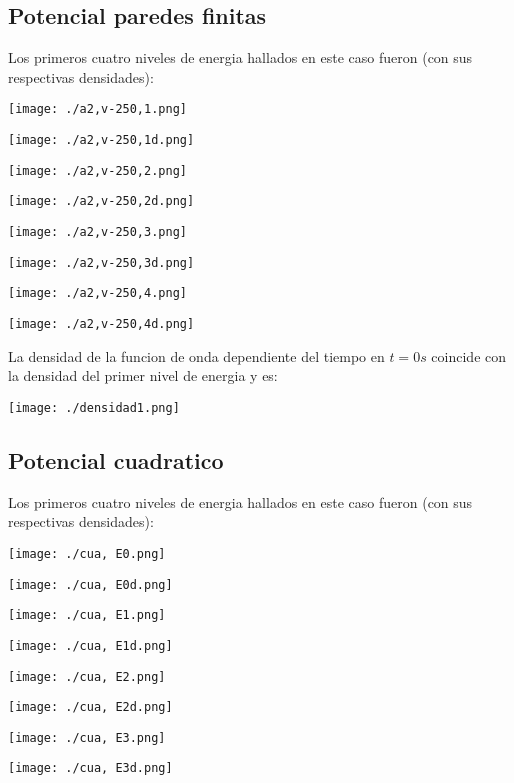 \documentclass[a4paper, twocolumn, 10pt]{article}
\begin{document}
\subsection{Potencial paredes finitas}
    Los primeros cuatro niveles de energia hallados en este caso fueron (con sus respectivas densidades):
    
    \texttt{[image: ./a2,v-250,1.png]}
    
    \texttt{[image: ./a2,v-250,1d.png]}
    
    \texttt{[image: ./a2,v-250,2.png]}
    
    \texttt{[image: ./a2,v-250,2d.png]}
    
    \texttt{[image: ./a2,v-250,3.png]}
    
    \texttt{[image: ./a2,v-250,3d.png]}
    
    \texttt{[image: ./a2,v-250,4.png]}
    
    \texttt{[image: ./a2,v-250,4d.png]}
    
    La densidad de la funcion de onda dependiente del tiempo en $t=0s$ coincide con la densidad del primer nivel de energia y es:
    
    \texttt{[image: ./densidad1.png]}
    
\subsection{Potencial cuadratico} 
    Los primeros cuatro niveles de energia hallados en este caso fueron (con sus respectivas densidades):
    
    \texttt{[image: ./cua, E0.png]}
    
    \texttt{[image: ./cua, E0d.png]}
    
    \texttt{[image: ./cua, E1.png]}
    
    \texttt{[image: ./cua, E1d.png]}
    
    \texttt{[image: ./cua, E2.png]}
    
    \texttt{[image: ./cua, E2d.png]}
    
    \texttt{[image: ./cua, E3.png]}
    
    \texttt{[image: ./cua, E3d.png]}
    
\end{document}

